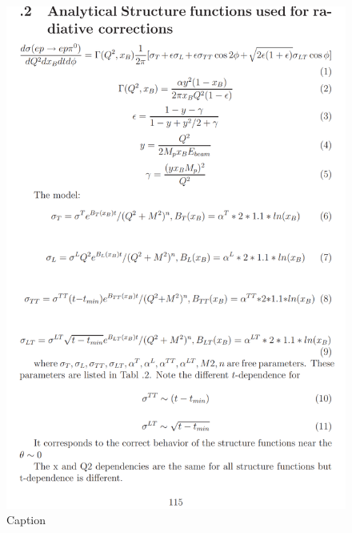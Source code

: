 \documentclass[oneside]{book}
\begin{document}
\begin{figure}
    \centering
    \includegraphics{radCorCLAS6.png}
    \caption{Caption}
    \label{fig:my_label}
\end{figure}
\end{document}
